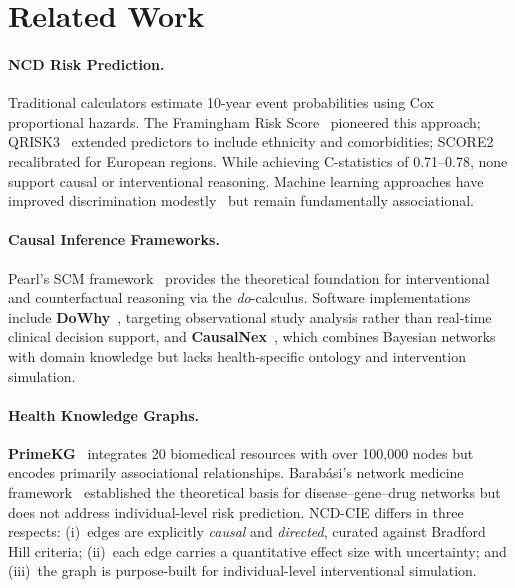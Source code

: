 \documentclass[runningheads]{llncs}
\begin{document}
\section{Related Work}\label{sec:related}

\paragraph{NCD Risk Prediction.}
Traditional calculators estimate 10-year event probabilities using Cox
proportional hazards.  The Framingham Risk
Score~\cite{dagostino2008framingham} pioneered this approach;
QRISK3~\cite{hippisley2017qrisk3} extended predictors to include
ethnicity and comorbidities; SCORE2~\cite{score22021} recalibrated
for European regions.  While achieving C-statistics of 0.71--0.78,
none support causal or interventional reasoning.  Machine learning
approaches have improved discrimination
modestly~\cite{alaa2019attentive} but remain fundamentally
associational.

\paragraph{Causal Inference Frameworks.}
Pearl's SCM framework~\cite{pearl2009causality} provides the
theoretical foundation for interventional and counterfactual reasoning
via the \emph{do}-calculus.  Software implementations include
\textbf{DoWhy}~\cite{sharma2020dowhy}, targeting observational study
analysis rather than real-time clinical decision support, and
\textbf{CausalNex}~\cite{beaumont2021causalnex}, which combines
Bayesian networks with domain knowledge but lacks health-specific
ontology and intervention simulation.

\paragraph{Health Knowledge Graphs.}
\textbf{PrimeKG}~\cite{chandak2023primekg} integrates 20 biomedical
resources with over 100{,}000 nodes but encodes primarily
associational relationships.  Barab\'{a}si's network medicine
framework~\cite{barabasi2011network} established the theoretical
basis for disease--gene--drug networks but does not address
individual-level risk prediction.  NCD-CIE differs in three respects:
(i)~edges are explicitly \emph{causal} and \emph{directed}, curated
against Bradford Hill criteria; (ii)~each edge carries a quantitative
effect size with uncertainty; and (iii)~the graph is purpose-built for
individual-level interventional simulation.
\end{document}
